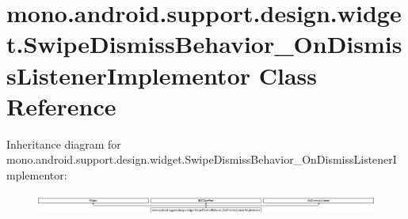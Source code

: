 \hypertarget{classmono_1_1android_1_1support_1_1design_1_1widget_1_1SwipeDismissBehavior__OnDismissListenerImplementor}{}\section{mono.\+android.\+support.\+design.\+widget.\+Swipe\+Dismiss\+Behavior\+\_\+\+On\+Dismiss\+Listener\+Implementor Class Reference}
\label{classmono_1_1android_1_1support_1_1design_1_1widget_1_1SwipeDismissBehavior__OnDismissListenerImplementor}
Inheritance diagram for mono.\+android.\+support.\+design.\+widget.\+Swipe\+Dismiss\+Behavior\+\_\+\+On\+Dismiss\+Listener\+Implementor\+:\begin{figure}[H]
\begin{center}
\leavevmode
\includegraphics[height=0.700438cm]{classmono_1_1android_1_1support_1_1design_1_1widget_1_1SwipeDismissBehavior__OnDismissListenerImplementor}
\end{center}
\end{figure}
